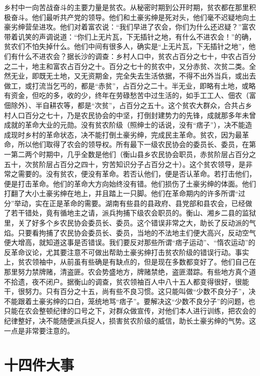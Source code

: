 乡村中一向苦战奋斗的主要力量是贫农。从秘密时期到公开时期，贫农都在那里积极奋斗。他们最听共产党的领导。他们和土豪劣绅是死对头，他们毫不迟疑地向土豪劣绅营垒进攻。他们对着富农说：“我们早进了农会，你们为什么还迟疑？”富农带着讥笑的声调说道：“你们上无片瓦，下无插针之地，有什么不进农会！”的确，贫农们不怕失掉什么。他们中间有很多人，确实是“上无片瓦，下无插针之地”，他们有什么不进农会？据长沙的调查：乡村人口中，贫农占百分之七十，中农占百分之二十，地主和富农占百分之十。百分之七十的贫农中，又分赤贫、次贫二类。全然无业，即既无土地，又无资期金，完全失去生活依据，不得不出外当兵，或出去做工，或打流当乞丐的，都是“赤贫”，占百分之二十。半无业，即略有土地，或略有资金，但吃的多，收的少，终年在劳碌愁苦中过生活的，如手工工人、佃农（富佃除外）、半自耕农等，都是“次贫”，占百分之五十。这个贫农大群众，合共占乡村人口百分之七十，乃是农民协会的中坚，打倒封建势力的先锋，成就那多年未曾成就的革命大业的元勋。没有贫农阶级（照绅士的话说，没有“痞子”），决不能造成现时乡村的革命状态，决不能打倒土豪劣绅，完成民主革命。贫农，因为最革命，所以他们取得了农会的领导权。所有最下一级农民协会的委员长、委员，在第一第二两个时期中，几乎全数是他们（衡山县乡农民协会职员，赤贫阶层占百分之五十，次贫阶层占百分之四十，穷苦知识分子占百分之十）。这个贫农领导，是非常之需要的。没有贫农，便没有革命。若否认他们，便是否认革命。若打击他们，便是打击革命。他们的革命大方向始终没有错。他们损伤了土豪劣绅的体面。他们打翻了大小土豪劣绅在地上，并且踏上一只脚。他们在革命期内的许多所谓“过分”举动，实在正是革命的需要。湖南有些县的县政府、县党部和县农会，已经做了若干错处，竟有循地主之请，派兵拘捕下级农会职员的。衡山、湘乡二县的监狱里，关了好多个乡农民协会委员长、委员。这个错误非常之大，助长了反动派的气焰。只要看拘捕了农民协会委员长、委员，当地的不法地主们便大高兴，反动空气便大增高，就知道这事是否错误。我们要反对那些所谓“痞子运动”、“惰农运动”的反革命议论，尤其要注意不可做出帮助土豪劣绅打击贫农阶级的错误行动。事实上，贫农领袖中，从前虽有些确是有缺点的，但是现在多数都变好了。他们自己在那里努力禁牌赌，清盗匪。农会势盛地方，牌赌禁绝，盗匪潜踪。有些地方真个道不拾遗，夜不闭户。据衡山的调查，贫农领袖百人中八十五人都变得很好，很能干，很努力。只有百分之十五，尚有些不良习惯。这只能叫做“少数不良分子”，决不能跟着土豪劣绅的口白，笼统地骂“痞子”。要解决这“少数不良分子”的问题，也只能在农会整顿纪律的口号之下，对群众做宣传，对他们本人进行训练，把农会的纪律整好，决不能随便派兵捉人，损害贫农阶级的威信，助长土豪劣绅的气势。这一点是非常要注意的。

\section{十四件大事}

